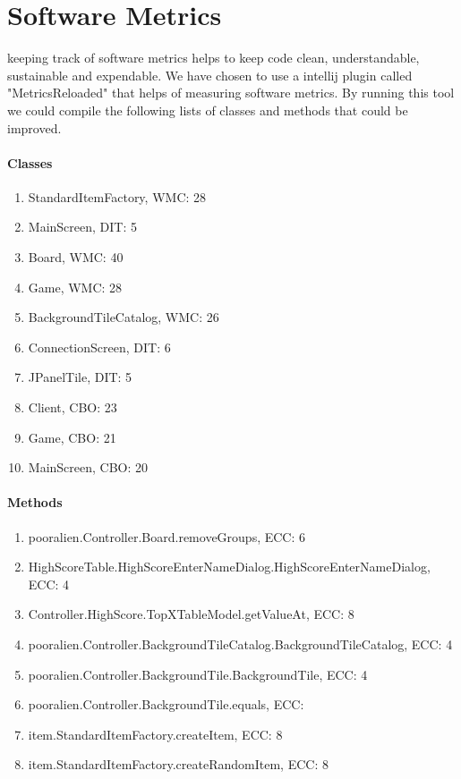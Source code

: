 \documentclass{article}
\begin{document}
\newpage
\section{Software Metrics}
keeping track of software metrics helps to keep code clean, understandable, sustainable and expendable. We have chosen to use a intellij plugin called "MetricsReloaded" that helps of measuring software metrics. By running this tool we could compile the following lists of classes and methods that could be improved.

\paragraph{Classes}
\begin{enumerate}
\item StandardItemFactory, WMC: 28
\item MainScreen, DIT: 5
\item Board, WMC: 40
\item Game, WMC: 28
\item BackgroundTileCatalog, WMC: 26
\item ConnectionScreen, DIT: 6
\item JPanelTile, DIT: 5
\item Client, CBO: 23
\item Game, CBO: 21
\item MainScreen, CBO: 20
\end{enumerate}

\paragraph{Methods}
\begin{enumerate}
\item pooralien.Controller.Board.removeGroups, ECC: 6
\item HighScoreTable.HighScoreEnterNameDialog.HighScoreEnterNameDialog, ECC: 4
\item Controller.HighScore.TopXTableModel.getValueAt, ECC: 8
\item pooralien.Controller.BackgroundTileCatalog.BackgroundTileCatalog, ECC: 4
\item pooralien.Controller.BackgroundTile.BackgroundTile, ECC: 4
\item pooralien.Controller.BackgroundTile.equals, ECC: 
\item item.StandardItemFactory.createItem, ECC: 8
\item item.StandardItemFactory.createRandomItem, ECC: 8
\end{enumerate}
\end{document}
